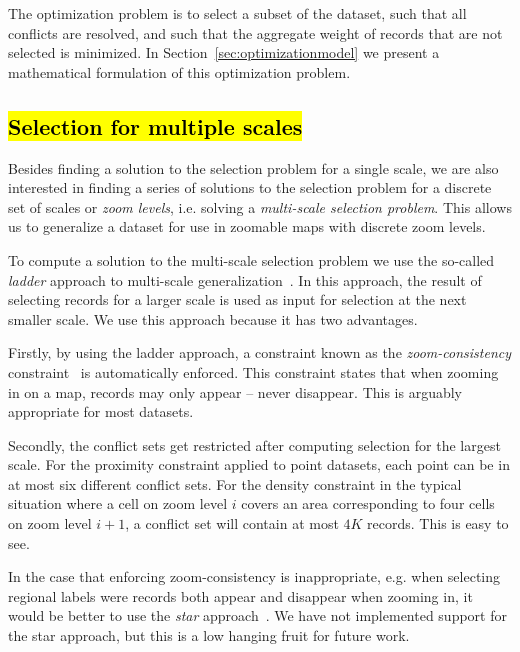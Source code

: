 The optimization problem is to select a subset of the dataset, such that all conflicts are resolved, and such that the aggregate weight of records that are not selected is minimized. In Section~\ref{sec:optimizationmodel} we present a mathematical formulation of this optimization problem.

\subsection{\hl{Selection for multiple scales}}
\label{sec:multi:scale:selection}
Besides finding a solution to the selection problem for a single scale, we are also interested in finding a series of solutions to the selection problem for a discrete set of scales or \emph{zoom levels}, i.e. solving a \emph{multi-scale selection problem}. This allows us to generalize a dataset for use in zoomable maps with discrete zoom levels.

To compute a solution to the multi-scale selection problem we use the so-called \emph{ladder} approach to multi-scale generalization~\cite{foerster2010challenges}. In this approach, the result of selecting records for a larger scale is used as input for selection at the next smaller scale. We use this approach because it has two advantages.

Firstly, by using the ladder approach, a constraint known as the \emph{zoom-consistency} constraint~\cite{sarma2012fusiontables} is automatically enforced. This constraint states that when zooming in on a map, records may only appear -- never disappear. This is arguably appropriate for most datasets. 

Secondly, the conflict sets get restricted after computing selection for the largest scale. For the proximity constraint applied to point datasets, each point can be in at most six different conflict sets. For the density constraint in the typical situation where a cell on zoom level $i$ covers an area corresponding to four cells on zoom level $i+1$, a conflict set will contain at most $4K$ records. This is easy to see.

In the case that enforcing zoom-consistency is inappropriate, e.g. when selecting regional labels were records both appear and disappear when zooming in, it would be better to use the \emph{star} approach~\cite{foerster2010challenges}. We have not implemented support for the star approach, but this is a low hanging fruit for future work.



